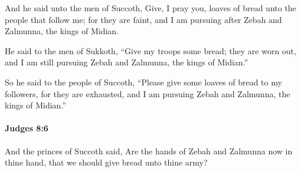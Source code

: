 			\begin{versebox}
					\item[BHS] 
					\item[ASV] And he said unto the men of Succoth, Give, I pray you, loaves of bread unto the people that follow me; for they are faint, and I am pursuing after Zebah and Zalmunna, the kings of Midian.
					\item[NIV] He said to the men of Sukkoth, “Give my troops some bread; they are worn out, and I am still pursuing Zebah and Zalmunna, the kings of Midian.”
					\item[NRSV] So he said to the people of Succoth, “Please give some loaves of bread to my followers, for they are exhausted, and I am pursuing Zebah and Zalmunna, the kings of Midian.”
			\end{versebox}

		\paragraph{Judges 8:6} %
			\label{JUDGES-8-6}

			And the princes of Succoth said, Are the hands of Zebah and Zalmunna now in thine hand, that we should give bread unto thine army?

